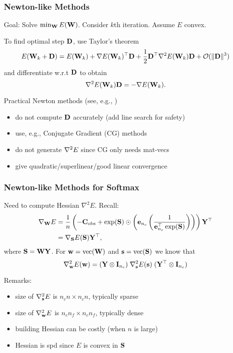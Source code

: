 \documentclass[12pt,fleqn,handout]{beamer}
\begin{document}
\begin{frame}\frametitle{Newton-like Methods}

Goal: Solve $\min_{{\bf W}} E({\bf W})$. Consider $k$th iteration. Assume $E$ convex.

\bigskip
\pause

To find optimal step ${\bf D}$, use Taylor's theorem
{\small{
$$ E({\bf W}_k + {\bf D}) = E({\bf W}_k) + \nabla E({\bf W}_k)^{\top} {\bf D} +
{\frac 12} {\bf D}^{\top} \nabla^2 E({\bf W}_k) {\bf D} +
{\cal O}(\|{\bf D}\|^3)  $$}}
and differentiate w.r.t ${\bf D}$ 
\pause
to obtain
$$ \nabla^2 E({\bf W}_k) {\bf D} = -\nabla E({\bf W}_k). $$

\pause

Practical Newton methods (see, e.g., \cite[Ch.7]{NocedalWright2006})
\begin{itemize}
\item do not compute ${\bf D}$ accurately (add line search for safety)
\item use, e.g., Conjugate Gradient (CG) methods
\item do not generate $\nabla^2 E$ since CG only needs mat-vecs
\item give quadratic/superlinear/good linear convergence
\end{itemize}

\end{frame}

\begin{frame}[fragile]\frametitle{Newton-like Methods for Softmax}

Need to compute Hessian $\nabla^2 E$. Recall: 
\begin{align*}
	\nabla_{{\bf W}}E &= \frac{1}{n} \left( -{\bf C}_{\rm obs} + \exp({\bf S}) \odot 
	\left( {\bf e}_{n_c} \left({\frac {1}{{\bf e}_{n_c}^\top \exp({\bf S})}}\right)\right) \right){\bf Y}^\top\\
              & =  \nabla_{\bf S} E({\bf S}) {\bf Y}^\top,
\end{align*}
where ${\bf S} = {\bf W} {\bf Y}$. 
\pause
For ${\bf w} = {\rm vec}({\bf W})$ and ${\bf s} = {\rm vec}({\bf S})$ we know that
$$
\nabla^2_{\bf w} E({\bf w}) = ({\bf Y} \otimes {\bf I}_{n_c}) \; \nabla_{{\bf s}}^2 E({\bf s})\;  ({\bf Y}^\top \otimes {\bf I}_{n_c})
$$

\pause

Remarks:
\begin{itemize}
\item size of $\nabla^2_{\bf s} E$ is $n_c n \times  n_c n$, typically sparse
\item size of $\nabla^2_{\bf w} E$ is $n_c n_f \times n_c n_f$, typically dense
\item building Hessian can be costly (when $n$ is large)
\item Hessian is spd since $E$ is convex in ${\bf S}$
\end{itemize}


\end{frame}
\end{document}
